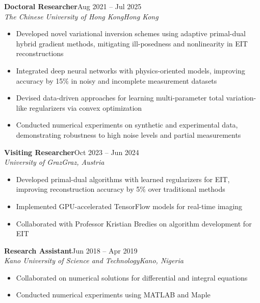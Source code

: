 \documentclass[11pt,a4paper]{article}
\newenvironment{cventry}[4]{%
    \par\noindent\begin{minipage}{\linewidth}%
    \noindent\textbf{#1}\hfill #2\\
    \textit{#3}\hfill\textit{#4}\par\vspace{2pt}%
}{%
    \end{minipage}\par
}
\begin{document}
\begin{cventry}{Doctoral Researcher}{Aug 2021 -- Jul 2025}{The Chinese University of Hong Kong}{Hong Kong}
\begin{itemize}[nosep, leftmargin=1.5em]
    \item Developed novel variational inversion schemes using adaptive primal-dual hybrid gradient methods, mitigating ill-posedness and nonlinearity in EIT reconstructions
    \item Integrated deep neural networks with physics-oriented models, improving accuracy by 15\% in noisy and incomplete measurement datasets
    \item Devised data-driven approaches for learning multi-parameter total variation-like regularizers via convex optimization
    \item Conducted numerical experiments on synthetic and experimental data, demonstrating robustness to high noise levels and partial measurements
\end{itemize}
\end{cventry}
\vspace{6pt}

\begin{cventry}{Visiting Researcher}{Oct 2023 -- Jun 2024}{University of Graz}{Graz, Austria}
\begin{itemize}[nosep, leftmargin=1.5em]
    \item Developed primal-dual algorithms with learned regularizers for EIT, improving reconstruction accuracy by 5\% over traditional methods
    \item Implemented GPU-accelerated TensorFlow models for real-time imaging
    \item Collaborated with Professor Kristian Bredies on algorithm development for EIT
\end{itemize}
\end{cventry}
\vspace{6pt}

\begin{cventry}{Research Assistant}{Jun 2018 -- Apr 2019}{Kano University of Science and Technology}{Kano, Nigeria}
\begin{itemize}[nosep, leftmargin=1.5em]
    \item Collaborated on numerical solutions for differential and integral equations
    \item Conducted numerical experiments using MATLAB and Maple
\end{itemize}
\end{cventry}
\end{document}
